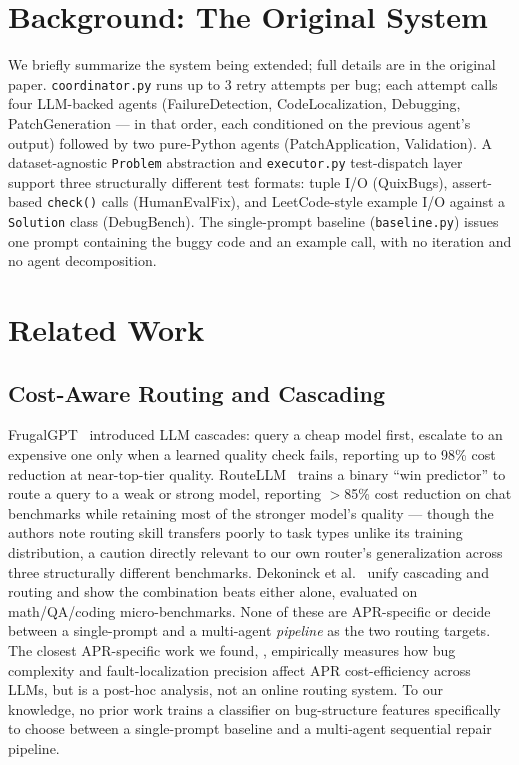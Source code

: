 \documentclass[conference]{IEEEtran}
\begin{document}
\section{Background: The Original System}
\label{sec:background}
We briefly summarize the system being extended; full details are in the original paper. \texttt{coordinator.py} runs up to 3 retry attempts per bug; each attempt calls four LLM-backed agents (FailureDetection, CodeLocalization, Debugging, PatchGeneration — in that order, each conditioned on the previous agent's output) followed by two pure-Python agents (PatchApplication, Validation). A dataset-agnostic \texttt{Problem} abstraction and \texttt{executor.py} test-dispatch layer support three structurally different test formats: tuple I/O (QuixBugs), assert-based \texttt{check()} calls (HumanEvalFix), and LeetCode-style example I/O against a \texttt{Solution} class (DebugBench). The single-prompt baseline (\texttt{baseline.py}) issues one prompt containing the buggy code and an example call, with no iteration and no agent decomposition.

\section{Related Work}
\label{sec:related}

\subsection{Cost-Aware Routing and Cascading}
FrugalGPT~\cite{frugalgpt} introduced LLM cascades: query a cheap model first, escalate to an expensive one only when a learned quality check fails, reporting up to 98\% cost reduction at near-top-tier quality. RouteLLM~\cite{routellm} trains a binary ``win predictor'' to route a query to a weak or strong model, reporting $>$85\% cost reduction on chat benchmarks while retaining most of the stronger model's quality — though the authors note routing skill transfers poorly to task types unlike its training distribution, a caution directly relevant to our own router's generalization across three structurally different benchmarks. Dekoninck et al.~\cite{cascaderouting} unify cascading and routing and show the combination beats either alone, evaluated on math/QA/coding micro-benchmarks. None of these are APR-specific or decide between a single-prompt and a multi-agent \emph{pipeline} as the two routing targets. The closest APR-specific work we found, \cite{aprcomplexity}, empirically measures how bug complexity and fault-localization precision affect APR cost-efficiency across LLMs, but is a post-hoc analysis, not an online routing system. To our knowledge, no prior work trains a classifier on bug-structure features specifically to choose between a single-prompt baseline and a multi-agent sequential repair pipeline.
\end{document}
